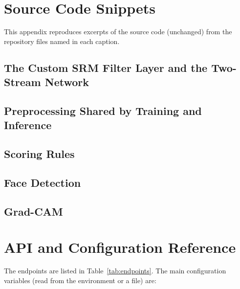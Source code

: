 \chapter{Source Code Snippets}
\label{app:code}
This appendix reproduces excerpts of the source code (unchanged) from the repository files named in each caption.

\section{The Custom SRM Filter Layer and the Two-Stream Network}


\section{Preprocessing Shared by Training and Inference}


\section{Scoring Rules}


\section{Face Detection}


\section{Grad-CAM}


\begingroup\let\clearpage\relax\let\cleardoublepage\relax\chapter{API and Configuration Reference}\label{app:api}\endgroup
The endpoints are listed in Table~\ref{tab:endpoints}. The main configuration variables (read from the environment or a  file) are:

